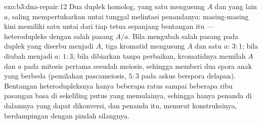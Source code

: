 \begin{solution}{exo:b3:dna-repair:12}
Dua duplek homolog, yang satu mengusung $A$ dan yang lain $a$, saling
mempertukarkan untai tunggal melintasi penandanya: masing-masing kini memiliki
satu untai dari tiap tetua sepanjang bentangan itu --- heterodupleks dengan
salah pasang $A/a$. Bila  mengubah salah pasang pada
duplek yang diserbu menjadi $A$, tiga kromatid mengusung $A$ dan satu $a$:
$3{:}1$; bila diubah menjadi $a$: $1{:}3$; bila dibiarkan tanpa perbaikan,
kromatidnya memilah $A$ dan $a$ pada mitosis pertama sesudah meiosis, sehingga
memberi dua spora anak yang berbeda (pemilahan pascameiosis, $5{:}3$ pada
askus berspora delapan). Bentangan heterodupleksnya hanya beberapa ratus
sampai beberapa ribu pasangan basa di sekeliling putus yang memulainya,
sehingga hanya penanda di dalamnya yang dapat dikonversi, dan penanda itu,
menurut konstruksinya, berdampingan dengan pindah silangnya.
\end{solution}

